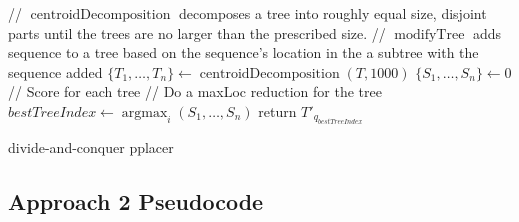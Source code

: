 \documentclass[11pt]{article}
\begin{document}
\begin{algorithm}[H]
\SetAlgoLined
{}
 // $\operatorname{centroidDecomposition}$ decomposes a tree into roughly equal size, disjoint parts until the trees are no larger than the prescribed size.\;
 // $\operatorname{modifyTree}$ adds sequence to a tree based on the sequence's location in the a subtree with the sequence added\;
 $\{T_1,\dots,T_n\} \leftarrow \operatorname{centroidDecomposition}(T,1000)$\;
 $\{S_1, \dots, S_n\} \leftarrow 0$ // Score for each tree\;
 // Do a maxLoc reduction for the tree\;
 $bestTreeIndex \leftarrow \operatorname{argmax}_{i} (S_1,\dots,S_n)$\;
 return $T'_{q_{bestTreeIndex}}$\;
 \caption{divide-and-conquer pplacer}
 \label{alg:approach1}
\end{algorithm}

\subsection{Approach 2 Pseudocode}
\end{document}
